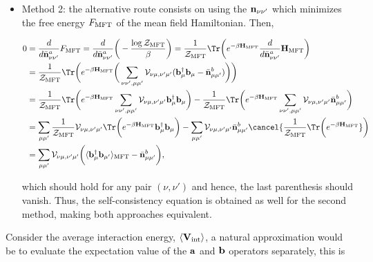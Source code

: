 \begin{itemize}
    \item Method 2: the alternative route consists on using the ${\bf n}_{\nu \nu'}$ which minimizes the free energy $F_{\textnormal{MFT}}$ of the mean field Hamiltonian. Then, 
    
    \begin{equation}
        \begin{split}
            0 &= \frac{d}{d\bar{\bf n}_{\nu \nu'}^{a}} F_{\textnormal{MFT}} = \frac{d}{d\bar{\bf n}_{\nu \nu'}^{a}} \bigg(-\frac{\log \mathcal{Z}_{\textnormal{MFT}}}{\beta}\bigg) = \frac{1}{\mathcal{Z}_{\textnormal{MFT}}} \Tr \bigg(e^{-\beta {\bf H}_{\textnormal{MFT}}} \frac{d}{d\bar{\bf n}_{\nu \nu'}^{a}} {\bf H}_{\textnormal{MFT}} \bigg) \\
            &=\frac{1}{\mathcal{Z}_{\textnormal{MFT}}} \Tr \bigg(e^{-\beta {\bf H}_{\textnormal{MFT}}} \bigg(\sum_{\nu\nu', \mu\mu'} {\mathcal{V}}_{\nu\mu, \nu'\mu'} ({\bf b}_{\mu}^\dagger {\bf b}_\mu - \bar{\bf n}_{\mu\mu'}^{b})\bigg)\bigg) \\
            &= \frac{1}{\mathcal{Z}_{\textnormal{MFT}}} \Tr \bigg(e^{-\beta {\bf H}_{\textnormal{MFT}}} \sum_{\nu\nu', \mu\mu'} {\mathcal{V}}_{\nu\mu, \nu'\mu'} {\bf b}_{\mu}^\dagger {\bf b}_\mu \bigg) - \frac{1}{\mathcal{Z}_{\textnormal{MFT}}} \Tr \bigg(e^{-\beta {\bf H}_{\textnormal{MFT}}} \sum_{\nu\nu', \mu\mu'} {\mathcal{V}}_{\nu\mu, \nu'\mu'}\bar{\bf n}_{\mu\mu'}^{b}\bigg)
            \\
            &= \sum_{\mu \mu'} \frac{1}{\mathcal{Z}_{\textnormal{MFT}}} {\mathcal{V}}_{\nu\mu, \nu'\mu'} \Tr \bigg(e^{-\beta {\bf H}_{\textnormal{MFT}}} {\bf b}_{\mu}^\dagger {\bf b}_\mu \bigg) - \sum_{\mu \mu'} {\mathcal{V}}_{\nu\mu, \nu'\mu'} \bar{\bf n}_{\mu\mu'}^{b} \cancel{\frac{1}{\mathcal{Z}_{\textnormal{MFT}}} \Tr \bigg(e^{-\beta {\bf H}_{\textnormal{MFT}}}}\bigg)\\
            &= \sum_{\mu\mu'} {\mathcal{V}}_{\nu\mu, \nu'\mu'} \bigg(\langle {\bf b}_{\mu}^\dagger {\bf b}_{\mu'} \rangle_{\textnormal{MFT}} - \bar{\bf n}_{\mu\mu'}^{b}\bigg), 
        \end{split}
    \end{equation}
    
    which should hold for any pair $(\nu, \nu')$ and hence, the last parenthesis should vanish. Thus, the self-consistency equation is obtained as well for the second method, making both approaches equivalent. \\
\end{itemize}

Consider the average interaction energy, $\langle {\bf V}_{\textnormal{int}} \rangle$, a natural approximation would be to evaluate the expectation value of the ${\bf a}$ and ${\bf b}$ operators separately, this is 

